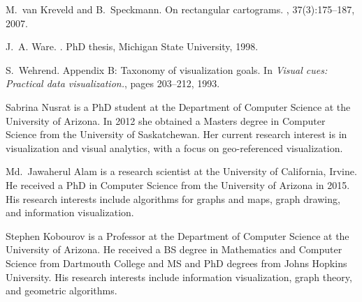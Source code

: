 \documentclass[10pt,journal,compsoc]{IEEEtran}
\begin{document}
\begin{thebibliography}{10}
M.~van Kreveld and B.~Speckmann.
\newblock On rectangular cartograms.
, 37(3):175--187, 2007.

J.~A. Ware.
.
\newblock PhD thesis, Michigan State University, 1998.

S.~Wehrend.
\newblock Appendix {B}: Taxonomy of visualization goals.
\newblock In {\em Visual cues: Practical data visualization.}, pages 203--212,
  1993.

\end{thebibliography}
 






\begin{IEEEbiography}
{Sabrina Nusrat}
 is a PhD student at the Department of Computer Science at the University of Arizona. In 2012 she obtained a Masters degree in Computer Science from the University of Saskatchewan. Her current research interest is in visualization and visual analytics, with a focus on geo-referenced visualization. 

\end{IEEEbiography}


\begin{IEEEbiography}
{Md.~Jawaherul Alam} 
is a research scientist at the University of California, Irvine. He received a PhD in Computer Science from the University of Arizona in 2015. His research interests include algorithms for graphs and maps, graph drawing, and information visualization.

\end{IEEEbiography}


\begin{IEEEbiography}
{Stephen Kobourov} is a Professor at the Department of Computer Science at the University of Arizona. He received a BS degree in Mathematics and Computer Science from Dartmouth College and MS and PhD degrees from Johns Hopkins University. His research interests include information visualization, graph theory, and geometric algorithms.

\end{IEEEbiography}
\end{document}
